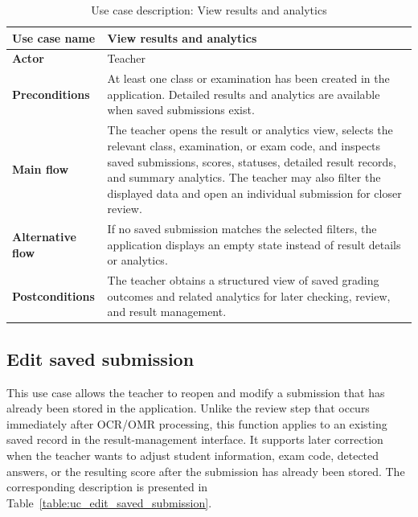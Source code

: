 \documentclass[../Main.tex]{subfiles}
\begin{document}
\begin{table}[H]
    \centering
    \caption{Use case description: View results and analytics}
    \label{table:uc_view_results}
    \renewcommand{\arraystretch}{1.25}
    \begin{tabular}{|p{}|p{}|}
        \hline
        \textbf{Use case name} & View results and analytics \\
        \hline
        \textbf{Actor} & Teacher \\
        \hline
        \textbf{Preconditions} & At least one class or examination has been created in the application. Detailed results and analytics are available when saved submissions exist. \\
        \hline
        \textbf{Main flow} & The teacher opens the result or analytics view, selects the relevant class, examination, or exam code, and inspects saved submissions, scores, statuses, detailed result records, and summary analytics. The teacher may also filter the displayed data and open an individual submission for closer review. \\
        \hline
        \textbf{Alternative flow} & If no saved submission matches the selected filters, the application displays an empty state instead of result details or analytics. \\
        \hline
        \textbf{Postconditions} & The teacher obtains a structured view of saved grading outcomes and related analytics for later checking, review, and result management. \\
        \hline
    \end{tabular}
\end{table}

\subsection{Edit saved submission}
\label{subsection:2.3.7}

This use case allows the teacher to reopen and modify a submission that has
already been stored in the application. Unlike the review step that occurs
immediately after OCR/OMR processing, this function applies to an existing
saved record in the result-management interface. It supports later correction
when the teacher wants to adjust student information, exam code, detected
answers, or the resulting score after the submission has already been stored.
The corresponding description is presented in
Table~\ref{table:uc_edit_saved_submission}.
\end{document}
